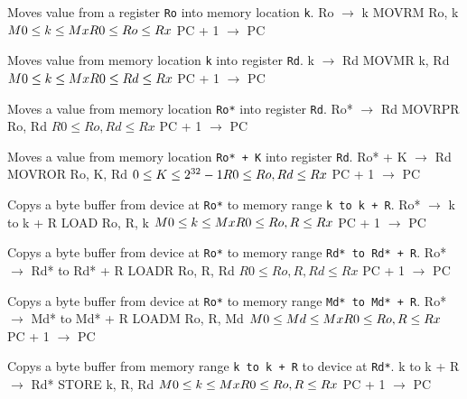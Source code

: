 \documentclass[titlepage]{scrartcl}
\begin{document}
{Moves value from a register \texttt{Ro} into memory location \texttt{k}.}
{Ro $\rightarrow$ k}
{MOVRM Ro, k}
{$M0 \leq k \leq Mx \hfill \break R0 \leq Ro \leq Rx$}
{PC + 1 $\rightarrow$ PC}
{}
{\srtable{}{}{}{}}

{Moves value from memory location \texttt{k} into register \texttt{Rd}.}
{k $\rightarrow$ Rd}
{MOVMR k, Rd}
{$M0 \leq k \leq Mx \hfill \break R0 \leq Rd \leq Rx$}
{PC + 1 $\rightarrow$ PC}
{}
{\srtable{}{}{}{}}

{Moves a value from memory location \texttt{Ro*} into register \texttt{Rd}.}
{Ro* $\rightarrow$ Rd}
{MOVRPR Ro, Rd}
{$R0 \leq Ro, Rd \leq Rx$}
{PC + 1 $\rightarrow$ PC}
{}
{\srtable{}{}{}{}}

{Moves a value from memory location \texttt{Ro* + K} into register \texttt{Rd}.}
{Ro* + K $\rightarrow$ Rd}
{MOVROR Ro, K, Rd}
{$0 \leq K \leq 2^{32} - 1 \hfill \break R0 \leq Ro, Rd \leq Rx$}
{PC + 1 $\rightarrow$ PC}
{}
{\srtable{}{}{}{}}

{Copys a byte buffer from device at \texttt{Ro*} to memory range \texttt{k to k + R}.}
{Ro* $\rightarrow$ k to k + R}
{LOAD Ro, R, k}
{$M0 \leq k \leq Mx \hfill \break R0 \leq Ro, R \leq Rx$}
{PC + 1 $\rightarrow$ PC}
{}
{\srtable{}{}{}{}}

{Copys a byte buffer from device at \texttt{Ro*} to memory range \texttt{Rd* to Rd* + R}.}
{Ro* $\rightarrow$ Rd* to Rd* + R}
{LOADR Ro, R, Rd}
{$R0 \leq Ro, R, Rd \leq Rx$}
{PC + 1 $\rightarrow$ PC}
{}
{\srtable{}{}{}{}}

{Copys a byte buffer from device at \texttt{Ro*} to memory range \texttt{Md* to Md* + R}.}
{Ro* $\rightarrow$ Md* to Md* + R}
{LOADM Ro, R, Md}
{$M0 \leq Md \leq Mx \hfill \break R0 \leq Ro, R \leq Rx$}
{PC + 1 $\rightarrow$ PC}
{}
{\srtable{}{}{}{}}

{Copys a byte buffer from memory range \texttt{k to k + R} to device at \texttt{Rd*}.}
{k to k + R $\rightarrow$ Rd*}
{STORE k, R, Rd}
{$M0 \leq k \leq Mx \hfill \break R0 \leq Ro, R \leq Rx$}
{PC + 1 $\rightarrow$ PC}
{}
{\srtable{}{}{}{}}
\end{document}
